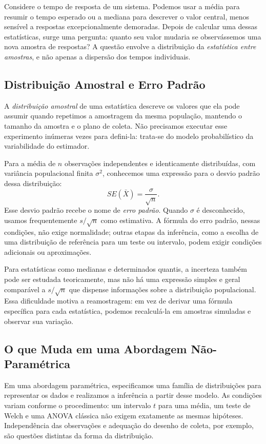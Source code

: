 \documentclass[12pt,a4paper]{article}
\begin{document}
Considere o tempo de resposta de um sistema. Podemos usar a média para resumir o tempo esperado ou a mediana para descrever o valor central, menos sensível a respostas excepcionalmente demoradas. Depois de calcular uma dessas estatísticas, surge uma pergunta: quanto seu valor mudaria se observássemos uma nova amostra de respostas? A questão envolve a distribuição da \emph{estatística entre amostras}, e não apenas a dispersão dos tempos individuais.

\subsection{Distribuição Amostral e Erro Padrão}
A \emph{distribuição amostral} de uma estatística descreve os valores que ela pode assumir quando repetimos a amostragem da mesma população, mantendo o tamanho da amostra e o plano de coleta. Não precisamos executar esse experimento inúmeras vezes para defini-la: trata-se do modelo probabilístico da variabilidade do estimador.

Para a média de $n$ observações independentes e identicamente distribuídas, com variância populacional finita $\sigma^2$, conhecemos uma expressão para o desvio padrão dessa distribuição:
\[
SE(\bar X)=\frac{\sigma}{\sqrt n}.
\]
Esse desvio padrão recebe o nome de \emph{erro padrão}. Quando $\sigma$ é desconhecido, usamos frequentemente $s/\sqrt n$ como estimativa. A fórmula do erro padrão, nessas condições, não exige normalidade; outras etapas da inferência, como a escolha de uma distribuição de referência para um teste ou intervalo, podem exigir condições adicionais ou aproximações.

Para estatísticas como medianas e determinados quantis, a incerteza também pode ser estudada teoricamente, mas não há uma expressão simples e geral comparável a $s/\sqrt n$ que dispense informações sobre a distribuição populacional. Essa dificuldade motiva a reamostragem: em vez de derivar uma fórmula específica para cada estatística, podemos recalculá-la em amostras simuladas e observar sua variação.

\subsection{O que Muda em uma Abordagem Não-Paramétrica}
Em uma abordagem paramétrica, especificamos uma família de distribuições para representar os dados e realizamos a inferência a partir desse modelo. As condições variam conforme o procedimento: um intervalo $t$ para uma média, um teste de Welch e uma ANOVA clássica não exigem exatamente as mesmas hipóteses. Independência das observações e adequação do desenho de coleta, por exemplo, são questões distintas da forma da distribuição.
\end{document}
